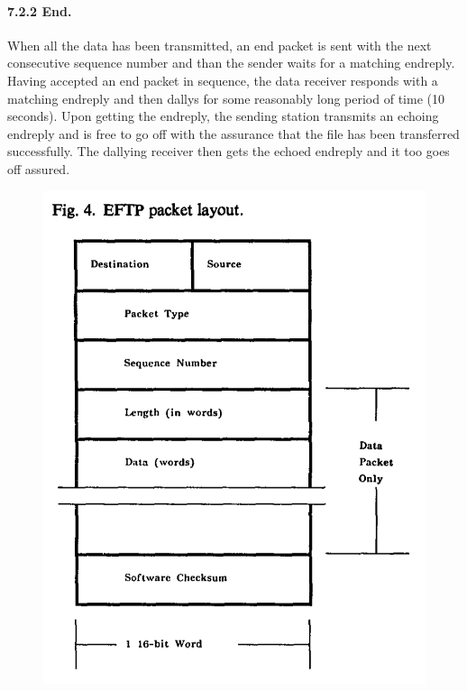 \paragraph{7.2.2 End.}
\vspace{-6pt} 
When all the data has been transmitted, an end packet is sent with the next consecutive sequence number and than the sender waits for a matching endreply. Having accepted an end packet in sequence, the data receiver responds with a matching endreply and then dallys for some reasonably long period of time (10 seconds). Upon getting the endreply, the sending station transmits an echoing endreply and is free to go off with the assurance that the file has been transferred successfully. The dallying receiver then gets the echoed endreply and it too goes off assured.

\vspace{-10pt}




\vspace{-16pt} 


 

\vspace{\fill} \pagebreak

\begin{figure}[h!]
\centering
  \includegraphics[trim =0mm 0mm 0mm 0mm, clip, width=0.7\columnwidth]{Figures/Ethernet-Fig-4.png} %
\end{figure}




